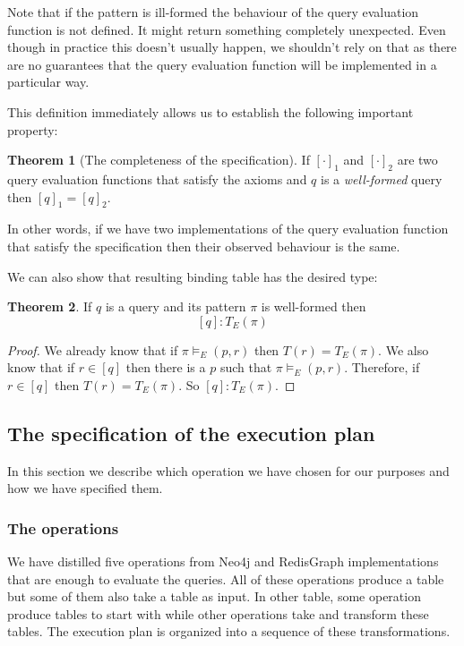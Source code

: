 \documentclass[14pt]{constructor-thesis}
\theoremstyle{definition}
\newtheorem*{theorem}{Theorem}
\begin{document}
Note that if the pattern is ill-formed the behaviour of the query evaluation function is not defined. It might return something completely unexpected. Even though in practice this doesn't usually happen, we shouldn't rely on that as there are no guarantees that the query evaluation function will be implemented in a particular way.

This definition immediately allows us to establish the following important property:
\begin{theorem}[The completeness of the specification]
  If $[\cdot]_1$ and $[\cdot]_2$ are two query evaluation functions that satisfy the axioms and $q$ is a \textit{well-formed} query then $[q]_1 = [q]_2$.
\end{theorem}

In other words, if we have two implementations of the query evaluation function that satisfy the specification then their observed behaviour is the same.

We can also show that resulting binding table has the desired type:
\begin{theorem}
  If $q$ is a query and its pattern $\pi$ is well-formed then
  $$[q] : T_E(\pi)$$
\end{theorem}
\begin{proof}
  We already know that if $\pi \models_E (p, r)$ then $T(r) = T_E(\pi)$. We also know that if $r \in [q]$ then there is a $p$ such that $\pi \models_E (p, r)$. Therefore, if $r \in [q]$ then $T(r) = T_E(\pi)$. So $[q] : T_E(\pi)$.
\end{proof}

\subsection{The specification of the execution plan}

In this section we describe which operation we have chosen for our purposes and how we have specified them.

\subsubsection{The operations}

We have distilled five operations from Neo4j and RedisGraph implementations that are enough to evaluate the queries. All of these operations produce a table but some of them also take a table as input. In other table, some operation produce tables to start with while other operations take and transform these tables. The execution plan is organized into a sequence of these transformations.
\end{document}
